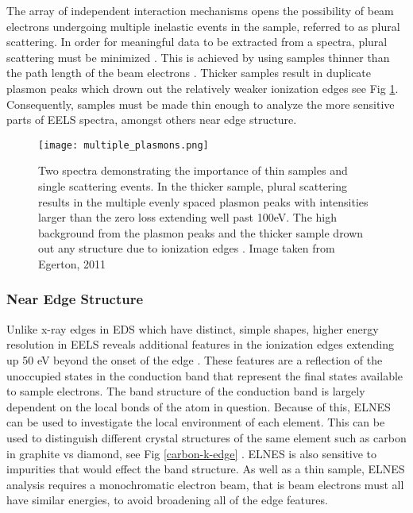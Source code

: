 
The array of independent interaction mechanisms opens the possibility of beam electrons undergoing multiple inelastic events in the sample, referred to as plural scattering.  In order for meaningful data to be extracted from a spectra, plural scattering must be minimized \cite{Egerton}. This is achieved by using samples thinner than the path length of the beam electrons \cite{Egerton}.  Thicker samples result in duplicate plasmon peaks which  drown out the relatively weaker ionization edges see Fig \ref{multiple_plasmons}.   Consequently, samples must be made thin enough to analyze the more sensitive parts of EELS spectra, amongst others near edge structure.

\begin{figure}
	\centering
	\texttt{[image: multiple\_plasmons.png]}
	\caption{Two spectra demonstrating the importance of thin samples and single scattering events. In the thicker sample, plural scattering results in the multiple evenly spaced plasmon peaks with  intensities larger than the zero loss extending well past 100eV.  The high background from the plasmon peaks and the thicker sample drown out any structure due to ionization edges \cite{Egerton}. Image taken from Egerton, 2011 \cite{Egerton}}
	\label{multiple_plasmons}
\end{figure}



\subsubsection{Near Edge Structure}
Unlike x-ray edges in EDS which have distinct, simple shapes, higher energy resolution in EELS reveals additional features in the ionization edges extending up 50 eV beyond the onset of the edge \cite{Egerton}.   These features are a reflection of the unoccupied states in the conduction band that represent the final states available to sample electrons.  The band structure of the conduction band is largely dependent on the local bonds of the atom in question.  Because of this, ELNES can be used to investigate the local environment of each element.  This can be used to distinguish different crystal structures of the same element such as carbon in graphite vs diamond, see Fig \ref{carbon-k-edge} \cite{hamon_elnes_2004}.  ELNES is also sensitive to impurities that would effect the band structure.  As well as a thin sample, ELNES analysis requires a monochromatic electron beam, that is beam electrons must all have similar energies, to avoid broadening all of the edge features.

